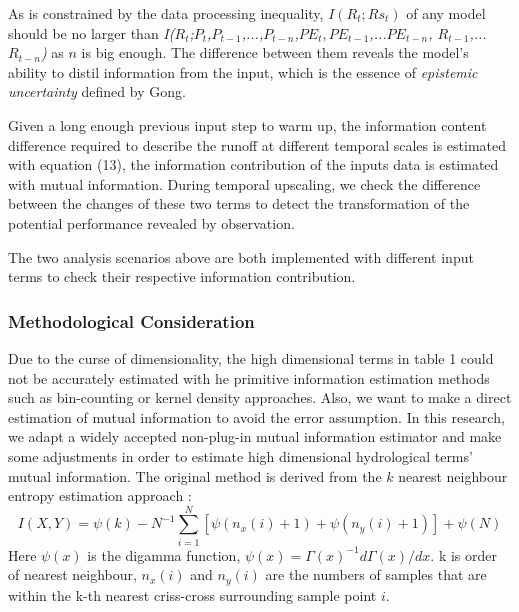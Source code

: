 \documentclass[11pt]{article}
\begin{document}
As is constrained by the data processing inequality, $I(R_t;Rs_t)$ of any model should be no larger than \emph{I($R_t$;$P_t$,$P_{t-1}$,...,$P_{t-n}$,$PE_t,PE_{t-1}$,...$PE_{t-n}$,
$R_{t-1}$,...$R_{t-n}$)} as $n$ is big enough. The difference between them reveals the model's ability to distil information from the input, which is the essence of \emph{ epistemic uncertainty} defined by Gong\cite{gong2013estimating}.  
 

Given a long enough previous input step to warm up, the information content difference required to describe the runoff at different temporal scales is estimated with equation (13), the information contribution of the inputs data is estimated with mutual information. During temporal upscaling, we check the difference between the changes of these two terms to detect the transformation of the potential performance revealed by observation.

The two analysis scenarios above are both implemented with different input terms to check their respective information contribution.




 

 
 







\subsubsection{Methodological Consideration}
Due to the curse of dimensionality, the high dimensional terms in table 1 could not be accurately estimated with he primitive information estimation methods such as bin-counting or kernel density approaches. Also, we want to make a direct estimation of mutual information to avoid the error assumption. In this research, we adapt a widely accepted non-plug-in mutual information estimator and make some adjustments in order to estimate high dimensional hydrological terms' mutual information. The original method is derived from the $k$ nearest neighbour entropy estimation approach \cite{kraskov2004estimating}:
\begin{equation}
I(X,Y)=\psi(k)-N^{-1}\sum_{i=1}^{N}[\psi(n_x(i)+1)+\psi(n_y(i)+1)]+\psi(N)
\end{equation}
Here $\psi(x)$ is the digamma function, $\psi(x)=\Gamma(x)^{-1}d\Gamma(x)/dx$. k is order of nearest neighbour, $n_x(i)$ and $n_y(i)$ are the numbers of samples that are within the k-th nearest  criss-cross surrounding sample point $i$.
\end{document}
